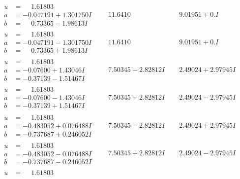 \documentclass[1p]{elsarticle_modified}
\theoremstyle{definition}
\begin{document}
$$\begin{array}{c|c|c}
\begin{aligned}
u &= \phantom{-}1.61803\phantom{ +0.000000I} \\
a &= -0.047191 + 1.301750 I \\
b &= \phantom{-}0.73365 - 1.98613 I\end{aligned}
 & \phantom{-}11.6410\phantom{ +0.000000I} & \phantom{-}9.01951 + 0. I\phantom{ +0.000000I} \\ \hline\begin{aligned}
u &= \phantom{-}1.61803\phantom{ +0.000000I} \\
a &= -0.047191 - 1.301750 I \\
b &= \phantom{-}0.73365 + 1.98613 I\end{aligned}
 & \phantom{-}11.6410\phantom{ +0.000000I} & \phantom{-}9.01951 + 0. I\phantom{ +0.000000I} \\ \hline\begin{aligned}
u &= \phantom{-}1.61803\phantom{ +0.000000I} \\
a &= -0.07600 + 1.43046 I \\
b &= -0.37139 - 1.51467 I\end{aligned}
 & \phantom{-}7.50345 - 2.82812 I & \phantom{-}2.49024 + 2.97945 I \\ \hline\begin{aligned}
u &= \phantom{-}1.61803\phantom{ +0.000000I} \\
a &= -0.07600 - 1.43046 I \\
b &= -0.37139 + 1.51467 I\end{aligned}
 & \phantom{-}7.50345 + 2.82812 I & \phantom{-}2.49024 - 2.97945 I \\ \hline\begin{aligned}
u &= \phantom{-}1.61803\phantom{ +0.000000I} \\
a &= -0.483052 + 0.076488 I \\
b &= -0.737687 + 0.246052 I\end{aligned}
 & \phantom{-}7.50345 - 2.82812 I & \phantom{-}2.49024 + 2.97945 I \\ \hline\begin{aligned}
u &= \phantom{-}1.61803\phantom{ +0.000000I} \\
a &= -0.483052 - 0.076488 I \\
b &= -0.737687 - 0.246052 I\end{aligned}
 & \phantom{-}7.50345 + 2.82812 I & \phantom{-}2.49024 - 2.97945 I \\ \hline\begin{aligned}
u &= \phantom{-}1.61803\phantom{ +0.000000I} \\

\end{aligned}
\end{array}$$
\end{document}

